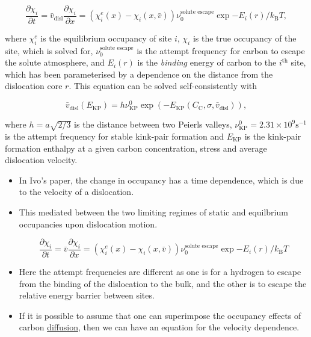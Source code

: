 \documentclass[a4paper,11pt]{article}
\begin{document}
\[ \frac{\partial \chi_i}{\partial t} = \bar{v}_{\text{disl} }\frac{\partial
    \chi_i}{\partial x} = \left( \chi_i^e(x) - \chi_i(x,\bar{v})
    \right) \nu_0^{\text{solute escape}} \exp{ - E_i(r) / k_{\text{B}} T}, \label{eq:ivo_diffusion_model} \]

where \(\chi^e_i\) is the equilibrium occupancy of site \(i\), \(\chi_i\) is the
true occupancy of the site, which is solved for, \(\nu_0^{\text{solute
    escape}}\) is the attempt frequency for carbon to escape the solute
atmosphere, and \(E_i(r)\) is the
\emph{binding} energy of carbon to the \(i^{\text{th}}\) site, which has been
parameterised by a dependence on the distance from the dislocation
core \(r\). This equation can be solved self-consistently with

\[ \bar{v}_{\text{disl}}(E_{\text{KP}}) = h\nu^0_{\text{KP} }
    \exp \left( -E_{\text{KP}}(C_{\text{C}}, \sigma, \bar{v}_{\text{disl} }) \right), \]

where \(h = a\sqrt{2/3}\) is the distance between two Peierls valleys,
\(\nu^0_{\text{KP} } = 2.31\times 10^{9} \text{s}^{-1}\) is the attempt
frequency for stable kink-pair formation and \(E_{\text{KP} }\) is the
kink-pair formation enthalpy at a given carbon concentration, stress and
average dislocation velocity.


\begin{itemize}
\item In Ivo's paper, the change in occupancy has a time dependence,
which is due to the velocity of a dislocation.
\item This mediated between the two limiting regimes of static and
equilbrium occupancies upon dislocation motion.

\[ \frac{\partial \chi_i}{\partial t} = \bar{v}\frac{\partial
      \chi_i}{\partial x} = \left( \chi_i^e(x) - \chi_i(x,\bar{v})
      \right) \nu_0^{\text{solute escape}} \exp{ - E_i(r) / k_{\text{B}} T} \]

\item Here the attempt frequencies are different as one is for a
hydrogen to escape from the binding of the dislocation to the
bulk, and the other is to escape the relative energy barrier
between sites.

\item If it is possible to assume that one can superimpose the
occupancy effects of carbon \uline{diffusion}, then we can have an
equation for the velocity dependence.
\end{itemize}
\end{document}
